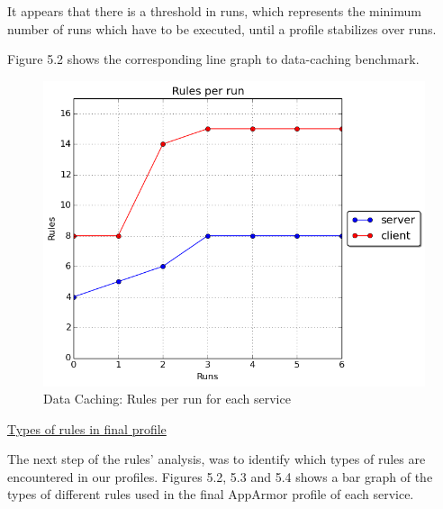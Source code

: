 It appears that there is a threshold in runs, which represents the minimum number of runs which have to be executed, until a profile stabilizes over runs.

Figure 5.2 shows the corresponding line graph to data-caching benchmark.

\begin{figure}[h!]
  \centering
   \includegraphics[width=0.8\linewidth]{./figures/datacaching/rules.png}
   \caption{Data Caching: Rules per run for each service}
\end{figure}


\hfill\break
\underline{Types of rules in final profile}
\hfill\break

The next step of the rules' analysis, was to identify which types of rules are encountered in our profiles. Figures 5.2, 5.3 and 5.4 shows a bar graph of the types of different rules used in the final AppArmor profile of each service. 


